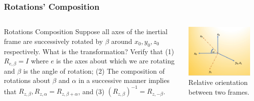 \begin{frame}
	\frametitle{Rotations' Composition}
	\begin{columns}[]
		\begin{column}{.65\linewidth}
			\begin{block}{Rotations Composition}
				Suppose all axes of the inertial frame are successively rotated by $\beta$  around $x_0, y_0, z_0$ respectively. What is the transformation? Verify that (1) $R_{e, \beta} = I$ where $e$ is the axes about which we are rotating and $\beta$ is the angle of rotation; (2) The composition of rotations about $\beta$ and $\alpha$ in a successive manner implies that $R_{z, \beta}, R_{z, \alpha} = R_{z, \beta + \alpha}$, and (3) ${(R_{z, \beta})}^{-1} = R_{z, -\beta}$. 
			\end{block}
		\end{column}
		\begin{column}{.45\linewidth}
			\centering
			\includegraphics[width=\textwidth]{../Notes/figures/two_frames.jpg}
			\footnotesize{Relative orientation between two frames.}
		\end{column}
	\end{columns}
\end{frame}


